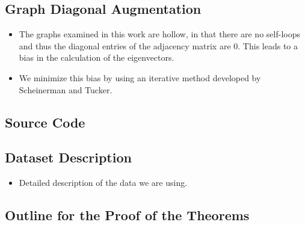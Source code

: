 \documentclass[a4paper]{article}
\begin{document}
\subsection{Graph Diagonal Augmentation}
\begin{itemize}
\item The graphs examined in this work are hollow, in that there are no self-loops and thus the diagonal entries of the adjacency matrix are 0. This leads to a bias in the calculation of the eigenvectors.
\item We minimize this bias by using an iterative method developed by Scheinerman and Tucker.
\end{itemize}

\subsection{Source Code}

\subsection{Dataset Description}
\begin{itemize}
\item Detailed description of the data we are using.
\end{itemize}

\subsection{Outline for the Proof of the Theorems}
\end{document}

